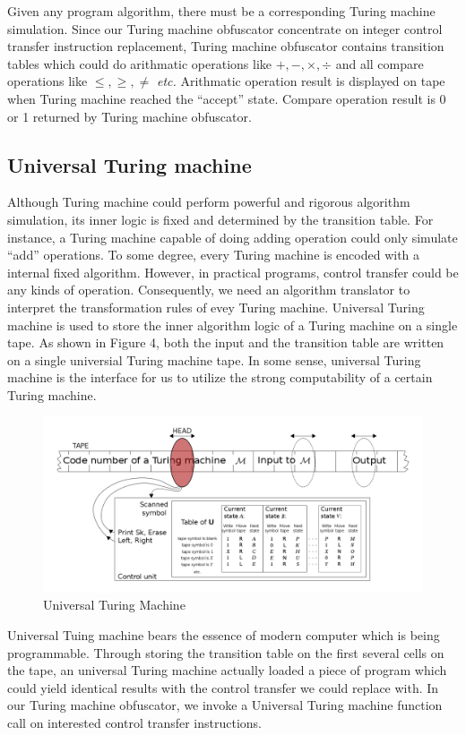 \documentclass[lnicst]{svmultln}
\begin{document}
Given any program algorithm, there must be a corresponding Turing machine simulation. Since our Turing machine obfuscator concentrate on integer control transfer instruction replacement, Turing machine obfuscator contains transition tables which could do arithmatic operations like \(+, -, \times, \div\) and all compare operations like \(\leq,\geq , \neq\) \textit{etc.} Arithmatic operation result is displayed on tape when Turing machine reached the ``accept'' state. Compare operation result is 0 or 1 returned by Turing machine obfuscator.
\subsection{Universal Turing machine}
Although Turing machine could perform powerful and rigorous algorithm simulation, its inner logic is fixed and determined by the transition table. For instance, a Turing machine capable of doing adding operation could only simulate ``add'' operations. To some degree, every Turing machine is encoded with a internal fixed algorithm. However, in practical programs, control transfer could be any kinds of operation. Consequently, we need an algorithm translator to interpret the transformation rules of evey Turing machine. Universal Turing machine is used to store the inner algorithm logic of a Turing machine on a single tape. As shown in Figure 4, both the input and the transition table are written on a single universial Turing machine tape. In some sense, universal Turing machine is the interface for us to utilize the strong computability of a certain Turing machine.

\begin{figure}
 \includegraphics[width=\linewidth]{UTM.png}
 \caption{Universal Turing Machine \cite{UTM}}
 \label{Figure 4}
\end{figure}

Universal Tuing machine bears the essence of modern computer which is being programmable. Through storing the transition table on the first several cells on the tape, an universal Turing machine actually loaded a piece of program which could yield identical results with the control transfer we could replace with. In our Turing machine obfuscator, we invoke a Universal Turing machine function call on interested control transfer instructions.
\end{document}
